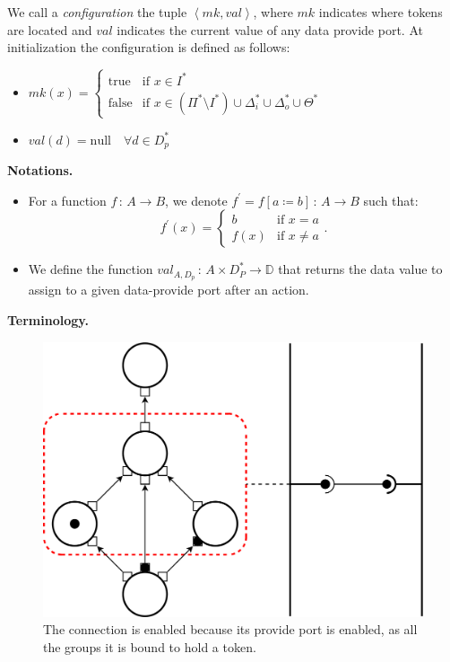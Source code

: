 We call a \emph{configuration} the tuple $\left\langle mk,val\right\rangle$,
where $mk$ indicates where tokens are located and $val$ indicates the
current value of any data provide port.
At initialization the configuration is defined as follows:
\begin{itemize}
\item $mk\left(x\right)=\begin{cases}
\text{true} & \text{if }x\in I^{*}\\
\text{false} & \text{if } x\in\left(\Pi^{*}\setminus I^*\right)\cup\Delta_{i}^{*}\cup\Delta_{o}^{*}\cup\Theta^{*}
\end{cases}$
\item $val\left(d\right)=\text{null}\quad\forall d \in D^*_{p}$
\end{itemize}

\noindent\textbf{Notations.}
\begin{itemize}
  \item For a function $f\,:\,A\rightarrow B$, we denote $f^{\prime}=f\left[a\coloneqq b\right]\,:\,A\rightarrow B$ such that:
    \begin{equation*}
      f^{\prime}\left(x\right)=\begin{cases}
      b & \text{if }x=a\\
      f\left(x\right) & \text{if }x\neq a
      \end{cases}.
    \end{equation*}
  \item We define the function $val_{A,D_p}\,:\,A\times
    D_{P}^*\rightarrow \mathbb{D}$ that returns the data value to assign to a
    given data-provide port after an action.
\end{itemize}

\noindent\textbf{Terminology.}

\begin{figure}[t]
  \begin{center}
    \includegraphics[width=0.7\columnwidth]{./images/enabled_service.pdf}

    \caption{The connection is enabled because its provide port is enabled, as all the groups it is bound to hold a token.}

    \label{fig:enabled_service}
  \end{center}
\end{figure}

